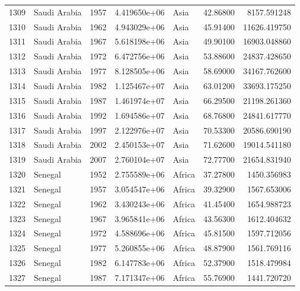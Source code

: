 \documentclass[
  letterpaper,
  DIV=11,
  numbers=noendperiod]{scrreprt}
\begin{document}
\begin{tabular}{llrrlrr}
1309 &              Saudi Arabia &  1957 &  4.419650e+06 &      Asia &  42.86800 &    8157.591248 \\
1310 &              Saudi Arabia &  1962 &  4.943029e+06 &      Asia &  45.91400 &   11626.419750 \\
1311 &              Saudi Arabia &  1967 &  5.618198e+06 &      Asia &  49.90100 &   16903.048860 \\
1312 &              Saudi Arabia &  1972 &  6.472756e+06 &      Asia &  53.88600 &   24837.428650 \\
1313 &              Saudi Arabia &  1977 &  8.128505e+06 &      Asia &  58.69000 &   34167.762600 \\
1314 &              Saudi Arabia &  1982 &  1.125467e+07 &      Asia &  63.01200 &   33693.175250 \\
1315 &              Saudi Arabia &  1987 &  1.461974e+07 &      Asia &  66.29500 &   21198.261360 \\
1316 &              Saudi Arabia &  1992 &  1.694586e+07 &      Asia &  68.76800 &   24841.617770 \\
1317 &              Saudi Arabia &  1997 &  2.122976e+07 &      Asia &  70.53300 &   20586.690190 \\
1318 &              Saudi Arabia &  2002 &  2.450153e+07 &      Asia &  71.62600 &   19014.541180 \\
1319 &              Saudi Arabia &  2007 &  2.760104e+07 &      Asia &  72.77700 &   21654.831940 \\
1320 &                   Senegal &  1952 &  2.755589e+06 &    Africa &  37.27800 &    1450.356983 \\
1321 &                   Senegal &  1957 &  3.054547e+06 &    Africa &  39.32900 &    1567.653006 \\
1322 &                   Senegal &  1962 &  3.430243e+06 &    Africa &  41.45400 &    1654.988723 \\
1323 &                   Senegal &  1967 &  3.965841e+06 &    Africa &  43.56300 &    1612.404632 \\
1324 &                   Senegal &  1972 &  4.588696e+06 &    Africa &  45.81500 &    1597.712056 \\
1325 &                   Senegal &  1977 &  5.260855e+06 &    Africa &  48.87900 &    1561.769116 \\
1326 &                   Senegal &  1982 &  6.147783e+06 &    Africa &  52.37900 &    1518.479984 \\
1327 &                   Senegal &  1987 &  7.171347e+06 &    Africa &  55.76900 &    1441.720720 \\

\end{tabular}
\end{document}
